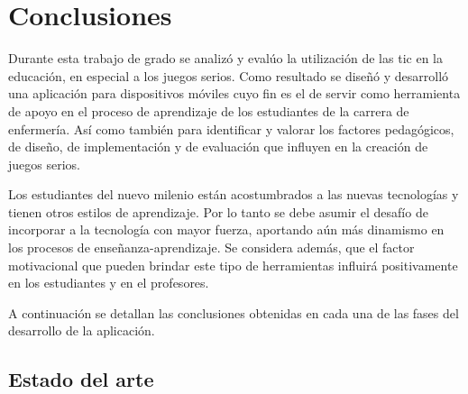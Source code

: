 
\section{Conclusiones}

Durante esta trabajo de grado se analizó y evalúo la utilización de las
\Gls{tic} en la educación, en especial a los juegos serios. Como resultado se
diseñó y desarrolló una aplicación para dispositivos móviles cuyo fin es el de
servir como herramienta de apoyo en el proceso de aprendizaje de los estudiantes
de la carrera de enfermería. Así como también para identificar y valorar
los factores pedagógicos, de diseño, de implementación y de evaluación que
influyen en la creación de juegos serios.


Los estudiantes del nuevo milenio están acostumbrados a las nuevas tecnologías y
tienen otros estilos de aprendizaje. Por lo tanto se debe asumir el desafío de
incorporar a la tecnología con mayor fuerza, aportando aún más dinamismo en los
procesos de enseñanza-aprendizaje. Se considera además, que el factor motivacional
que pueden brindar este tipo de herramientas influirá positivamente en los
estudiantes y en el profesores.

A continuación se detallan las conclusiones obtenidas en cada una de las fases
del desarrollo de la aplicación.

\subsection{Estado del arte}

